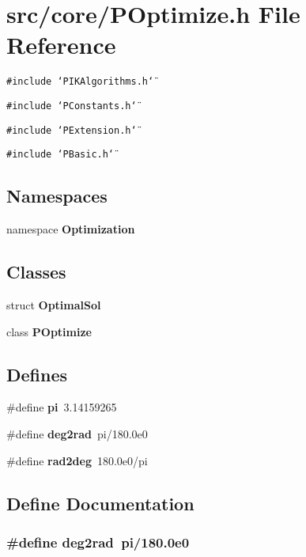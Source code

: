 \section{src/core/POptimize.h File Reference}
\label{POptimize_8h}


{\tt \#include \char`\"{}PIKAlgorithms.h\char`\"{}}\par
{\tt \#include \char`\"{}PConstants.h\char`\"{}}\par
{\tt \#include \char`\"{}PExtension.h\char`\"{}}\par
{\tt \#include \char`\"{}PBasic.h\char`\"{}}\par
\subsection*{Namespaces}
\begin{CompactItemize}
\item 
namespace {\bf Optimization}
\end{CompactItemize}
\subsection*{Classes}
\begin{CompactItemize}
\item 
struct {\bf Optimal\-Sol}
\item 
class {\bf POptimize}
\end{CompactItemize}
\subsection*{Defines}
\begin{CompactItemize}
\item 
\#define {\bf pi}~3.14159265
\item 
\#define {\bf deg2rad}~pi/180.0e0
\item 
\#define {\bf rad2deg}~180.0e0/pi
\end{CompactItemize}


\subsection{Define Documentation}
\subsubsection{\setlength{\rightskip}{0pt plus 5cm}\#define deg2rad~pi/180.0e0}\label{POptimize_8h_0224561b0395b85ca3b1c11acb093ea4}



